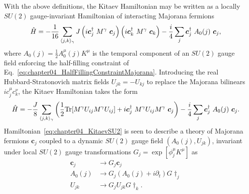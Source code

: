 With the above definitions, the Kitaev Hamiltonian may be written as a locally $SU(2)$ gauge-invariant Hamiltonian of interacting Majorana fermions
%
\begin{equation}
	\hat{H} = -\frac{1}{16} \sum_{\langle j,k \rangle_{\gamma}} J \left(i\bm{c}^{\dagger}_j ~ M^{\gamma} ~ \bm{c}_j\right) \left(i\bm{c}^{\dagger}_k ~ M^{\gamma} ~ \bm{c}_k\right) - \frac{i}{4} \sum_j \bm{c}^{\dagger}_j ~ A_0(j) ~ \bm{c}_j,
\end{equation}
%
where $A_0(j) = \frac{1}{2} A^{\mu}_0(j) K^{\mu}$ is the temporal component of an $SU(2)$ gauge field enforcing the half-filling constraint of Eq.~\eqref{eq:chapter04_HalfFillingConstraintMajorana}.
Introducing the real Hubbard-Stratonovich matrix fields $U_{jk} = -U_{kj}$ to replace the Majorana bilinears $i c^{\mu}_j c^{\nu}_k$, the Kitaev Hamiltonian takes the form
%
\begin{equation}
	\hat{H} = -\frac{J}{8} \sum_{\langle j,k \rangle_{\gamma}} \left(\frac{1}{2} \text{Tr}{[M^{\gamma} U_{ij} M^{\gamma} U_{ij}]} + i\bm{c}^{\dagger}_j ~ M^{\gamma} U_{ij} M^{\gamma} ~ \bm{c}_j\right) - \frac{i}{4} \sum_j \bm{c}^{\dagger}_j ~ A_0(j) ~ \bm{c}_j.
	\label{eq:chapter04_KitaevSU2}
\end{equation}
%
Hamiltonian~\eqref{eq:chapter04_KitaevSU2} is seen to describe a theory of Majorana fermions $\bm{c}_j$ coupled to a dynamic $SU(2)$ gauge field $(A_0(j), U_{jk})$, invariant under local $SU(2)$ gauge transformations $G_j = \exp{[\phi^{\mu}_j K^{\mu}]}$ as
%
\begin{align}
	\bm{c}_j	&\rightarrow G_j \bm{c}_j \nonumber\\
	A_0(j)		&\rightarrow G_j (A_0(j) + i \partial_t) G\dag_j \nonumber\\
	U_{jk}		&\rightarrow G_j U_{jk} G\dag_k.
\end{align}
%


